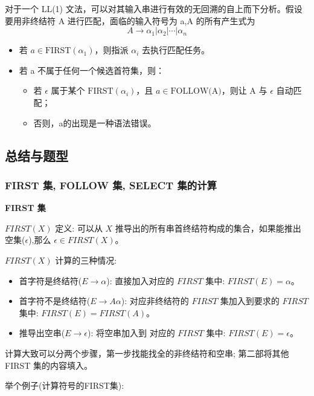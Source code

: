 对于一个 LL(1) 文法，可以对其输入串进行有效的无回溯的自上而下分析。假设要用非终结符 A 进行匹配，面临的输入符号为 a,A 的所有产生式为
\[ A \rightarrow \alpha_1 | \alpha_2 | \cdots | \alpha_n \]
\begin{itemize}
    \item 若 $a\in \text{FIRST}(\alpha_1)$，则指派 $\alpha_i$ 去执行匹配任务。
    \item 若 a 不属于任何一个候选首符集，则：
          \begin{itemize}
              \item 若 $\epsilon$ 属于某个 $\text{FIRST}(\alpha_i)$，且 $a\in \text{FOLLOW(A)}$，则让 A 与 $\epsilon$ 自动匹配；
              \item 否则，a的出现是一种语法错误。
          \end{itemize}
\end{itemize}



\subsection{总结与题型}
\subsubsection{\textcolor{imp}{FIRST 集, FOLLOW 集, SELECT 集的计算}}
\noindent\textbf{FIRST 集}

$FIRST(X)$ 定义: 可以从 $X$ 推导出的所有串首终结符构成的集合，如果能推出空集($\epsilon$),那么 $\epsilon \in FIRST(X)$。

$FIRST(X)$ 计算的三种情况:
\begin{itemize}
    \item 首字符是终结符($E \rightarrow \alpha$): 直接加入对应的 $FIRST$ 集中: $FIRST(E) = \alpha$。
    \item 首字符不是终结符($E \rightarrow A\alpha$): 对应非终结符的 $FIRST$ 集加入到要求的 $FIRST$ 集中: $FIRST(E) = FIRST(A)$。
    \item 推导出空串($E \rightarrow \epsilon$): 将空串加入到 对应的 $FIRST$ 集中: $FIRST(E) = \epsilon$。
\end{itemize}

计算大致可以分两个步骤，第一步找能找全的非终结符和空串; 第二部将其他 FIRST 集的内容填入。

举个例子(计算符号的FIRST集):

